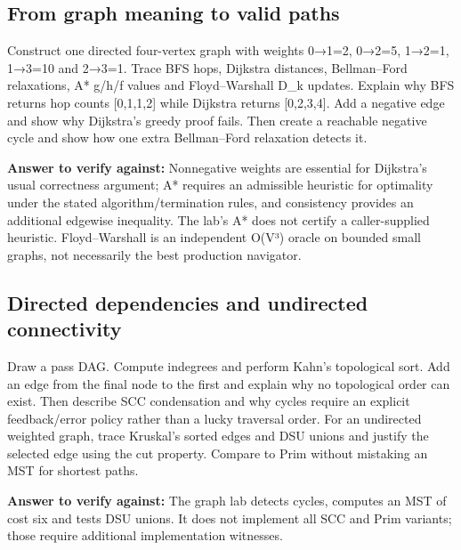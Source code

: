 \subsection{From graph meaning to valid paths}\label{appendix-8a046b38375e-from-graph-meaning-to-valid-paths}

\hypertarget{appendix-8a046b38375e-from-graph-meaning-to-valid-paths}{}

Construct one directed four-vertex graph with weights 0→1=2, 0→2=5, 1→2=1, 1→3=10 and 2→3=1. Trace BFS hops, Dijkstra distances, Bellman--Ford relaxations, A* g/h/f values and Floyd--Warshall D\_k updates. Explain why BFS returns hop counts {[}0,1,1,2{]} while Dijkstra returns {[}0,2,3,4{]}. Add a negative edge and show why Dijkstra's greedy proof fails. Then create a reachable negative cycle and show how one extra Bellman--Ford relaxation detects it.

\textbf{Answer to verify against:} Nonnegative weights are essential for Dijkstra's usual correctness argument; A* requires an admissible heuristic for optimality under the stated algorithm/termination rules, and consistency provides an additional edgewise inequality. The lab's A* does not certify a caller-supplied heuristic. Floyd--Warshall is an independent O(V³) oracle on bounded small graphs, not necessarily the best production navigator.

\subsection{Directed dependencies and undirected connectivity}\label{appendix-8a046b38375e-directed-dependencies-and-undirected-connectivity}

\hypertarget{appendix-8a046b38375e-directed-dependencies-and-undirected-connectivity}{}

Draw a pass DAG. Compute indegrees and perform Kahn's topological sort. Add an edge from the final node to the first and explain why no topological order can exist. Then describe SCC condensation and why cycles require an explicit feedback/error policy rather than a lucky traversal order. For an undirected weighted graph, trace Kruskal's sorted edges and DSU unions and justify the selected edge using the cut property. Compare to Prim without mistaking an MST for shortest paths.

\textbf{Answer to verify against:} The graph lab detects cycles, computes an MST of cost six and tests DSU unions. It does not implement all SCC and Prim variants; those require additional implementation witnesses.

